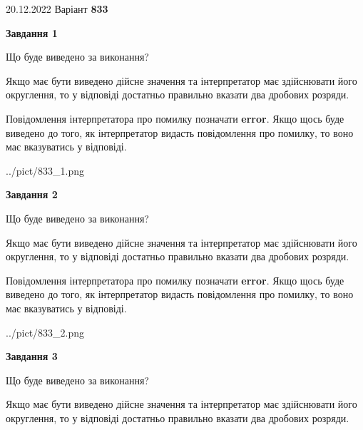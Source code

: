 \documentclass[12pt, ukrainian]{article}
\begin{document}
{20.12.2022 Варіант \No \textbf { 833 }\par}
{
\begin {Large}

{\begin {center}\textbf{Завдання 1}\end {center}}\par
Що буде виведено за виконання? \par

Якщо має бути виведено дійсне значення та інтерпретатор має здійснювати його округлення, 
то у відповіді достатньо правильно вказати два дробових розряди.

Повідомлення інтерпретатора про помилку позначати \textbf{error}.
Якщо щось буде виведено до того, як інтерпретатор видасть повідомлення про помилку, 
то воно має вказуватись у відповіді. \par

\begin{center}
	{../pict/833_1.png}
\end{center}
\newpage

{\begin {center}\textbf{Завдання 2}\end {center}}\par
Що буде виведено за виконання? \par

Якщо має бути виведено дійсне значення та інтерпретатор має здійснювати його округлення, 
то у відповіді достатньо правильно вказати два дробових розряди.

Повідомлення інтерпретатора про помилку позначати \textbf{error}.
Якщо щось буде виведено до того, як інтерпретатор видасть повідомлення про помилку, 
то воно має вказуватись у відповіді. \par

\begin{center}
	{../pict/833_2.png}
\end{center}
\newpage

{\begin {center}\textbf{Завдання 3}\end {center}}\par
Що буде виведено за виконання? \par

Якщо має бути виведено дійсне значення та інтерпретатор має здійснювати його округлення, 
то у відповіді достатньо правильно вказати два дробових розряди.


\end{Large}}
\end{document}
